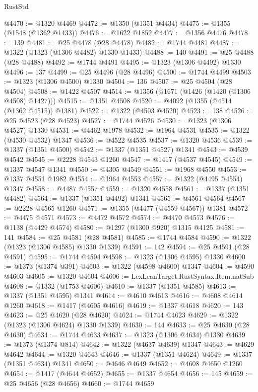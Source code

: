 \begin{lexlean}{RustStd}
\begin{coremodule}
{\begin{coremodule}
{{{{{{{{{{{{{{{{{{{{{{{{{{{{{{{{{{@4470 := @1320 @4469
@4472 := @1350 (@1351 @4434)
@4475 := @1355 (@1548 (@1362 @1433))
@4476 := @1622 @1852
@4477 := @1356 @4476
@4478 := 139
@4481 := @25 @4478 (@28 @4478)
@4482 := @1744 @4481
@4487 := @1322 (@1323 (@1306 @4482) @1330 @1433)
@4488 := 140
@4491 := @25 @4488 (@28 @4488)
@4492 := @1744 @4491
@4495 := @1323 (@1306 @4492) @1330
@4496 := 137
@4499 := @25 @4496 (@28 @4496)
@4500 := @1744 @4499
@4503 := @1323 (@1306 @4500) @1330
@4504 := 136
@4507 := @25 @4504 (@28 @4504)
@4508 := @1422 @4507
@4514 := @1356 (@1671 (@1426 (@1420 (@1306 @4508) @1427)))
@4515 := @1351 @4508
@4520 := @4092 (@1355 (@4514 (@1362 @4515)) @1381)
@4522 := @1322 (@4503 @4520)
@4523 := 138
@4526 := @25 @4523 (@28 @4523)
@4527 := @1744 @4526
@4530 := @1323 (@1306 @4527) @1330
@4531 := @4462 @1978
@4532 := @1964 @4531
@4535 := @1322 (@4530 @4532) @1347
@4536 := @4522 @4535
@4537 := @1320 @4536
@4539 := @1337 (@1351 @4500)
@4542 := @1337 (@1351 @4527) @1341
@4543 := @4539 @4542
@4545 := @2228 @4543 @1260
@4547 := @1417 (@4537 @4545)
@4549 := @1337 @4547 @1341
@4550 := @4305 @4549
@4551 := @1968 @4550
@4553 := @1337 @4551 @1982
@4554 := @1964 @4553
@4557 := @1322 (@4495 @4554) @1347
@4558 := @4487 @4557
@4559 := @1320 @4558
@4561 := @1337 (@1351 @4482)
@4564 := @1337 (@1351 @4492) @1341
@4565 := @4561 @4564
@4567 := @2228 @4565 @1260
@4571 := @1355 (@4477 (@4559 @4567)) @1381
@4572 := @4475 @4571
@4573 := @4472 @4572
@4574 := @4470 @4573
@4576 := @1138 (@4429 @4574)
@4580 := @1297 (@1300 @920) @1315 @4125
@4581 := 141
@4584 := @25 @4581 (@28 @4581)
@4585 := @1744 @4584
@4590 := @1322 (@1323 (@1306 @4585) @1330 @1339)
@4591 := 142
@4594 := @25 @4591 (@28 @4591)
@4595 := @1744 @4594
@4598 := @1323 (@1306 @4595) @1330
@4600 := @1373 (@1374 @391)
@4603 := @1322 (@4598 @4600) @1347
@4604 := @4590 @4603
@4605 := @1320 @4604
@4606 := LexLeanTarget.RustSyntax.Item.natSub
@4608 := @1332 (@1753 @4606)
@4610 := @1337 (@1351 @4585)
@4613 := @1337 (@1351 @4595) @1341
@4614 := @4610 @4613
@4616 := @4608 @4614 @1260
@4618 := @1417 (@4605 @4616)
@4619 := @1337 @4618
@4620 := 143
@4623 := @25 @4620 (@28 @4620)
@4624 := @1744 @4623
@4629 := @1322 (@1323 (@1306 @4624) @1330 @1339)
@4630 := 144
@4633 := @25 @4630 (@28 @4630)
@4634 := @1744 @4633
@4637 := @1323 (@1306 @4634) @1330
@4639 := @1373 (@1374 @814)
@4642 := @1322 (@4637 @4639) @1347
@4643 := @4629 @4642
@4644 := @1320 @4643
@4646 := @1337 (@1351 @4624)
@4649 := @1337 (@1351 @4634) @1341
@4650 := @4646 @4649
@4652 := @4608 @4650 @1260
@4654 := @1417 (@4644 @4652)
@4655 := @1337 @4654
@4656 := 145
@4659 := @25 @4656 (@28 @4656)
@4660 := @1744 @4659
}}}}}}}}}}}}}}}}}}}}}}}}}}}}}}}}}}
\end{coremodule}}
\end{coremodule}
\end{lexlean}
